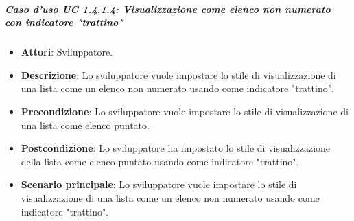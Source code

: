 \subparagraph{Caso d'uso UC 1.4.1.4: Visualizzazione come elenco non numerato con indicatore "trattino"}

\FloatBarrier
\begin{itemize}
\item\textbf{Attori}: Sviluppatore.
\item\textbf{Descrizione}: Lo sviluppatore vuole impostare lo stile di visualizzazione di una lista come un elenco non numerato usando come indicatore "trattino".
\item\textbf{Precondizione}: Lo sviluppatore vuole impostare lo stile di visualizzazione di una lista come elenco puntato.
\item\textbf{Postcondizione}: Lo sviluppatore ha impostato lo stile di visualizzazione della lista come elenco puntato usando come indicatore "trattino".
\item\textbf{Scenario principale}: Lo sviluppatore vuole impostare lo stile di visualizzazione di una lista come un elenco non numerato usando come indicatore "trattino".
\end{itemize}
